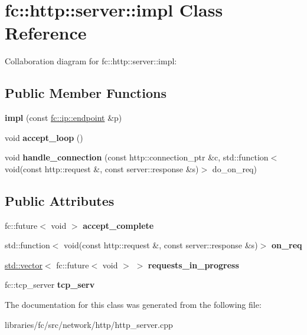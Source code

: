 \hypertarget{classfc_1_1http_1_1server_1_1impl}{}\section{fc\+:\+:http\+:\+:server\+:\+:impl Class Reference}
\label{classfc_1_1http_1_1server_1_1impl}


Collaboration diagram for fc\+:\+:http\+:\+:server\+:\+:impl\+:
\subsection*{Public Member Functions}
\begin{DoxyCompactItemize}
\item 
\mbox{\label{classfc_1_1http_1_1server_1_1impl_a37711a9ff92189c2bc7e59678b7c1843}} 
{\bfseries impl} (const \mbox{\hyperlink{classfc_1_1ip_1_1endpoint}{fc\+::ip\+::endpoint}} \&p)
\item 
\mbox{\label{classfc_1_1http_1_1server_1_1impl_aabc0d2b805bc3817da2f044adcb40d69}} 
void {\bfseries accept\+\_\+loop} ()
\item 
\mbox{\label{classfc_1_1http_1_1server_1_1impl_a7813e46dca69d44eb24a3ee0d6add574}} 
void {\bfseries handle\+\_\+connection} (const http\+::connection\+\_\+ptr \&c, std\+::function$<$ void(const http\+::request \&, const server\+::response \&s)$>$ do\+\_\+on\+\_\+req)
\end{DoxyCompactItemize}
\subsection*{Public Attributes}
\begin{DoxyCompactItemize}
\item 
\mbox{\label{classfc_1_1http_1_1server_1_1impl_a7b4b735ed75ec432b5ceaf0fc8eb5670}} 
fc\+::future$<$ void $>$ {\bfseries accept\+\_\+complete}
\item 
\mbox{\label{classfc_1_1http_1_1server_1_1impl_ab2bc0ecaf14d8ea531b0bd8c30ad5ebf}} 
std\+::function$<$ void(const http\+::request \&, const server\+::response \&s)$>$ {\bfseries on\+\_\+req}
\item 
\mbox{\label{classfc_1_1http_1_1server_1_1impl_a16522f5143dd2e01d81cc837acde2af3}} 
\mbox{\hyperlink{classstd_1_1vector}{std\+::vector}}$<$ fc\+::future$<$ void $>$ $>$ {\bfseries requests\+\_\+in\+\_\+progress}
\item 
\mbox{\label{classfc_1_1http_1_1server_1_1impl_ad32181bd6cc2d0942ca0295a6ea5d5a9}} 
fc\+::tcp\+\_\+server {\bfseries tcp\+\_\+serv}
\end{DoxyCompactItemize}


The documentation for this class was generated from the following file\+:\begin{DoxyCompactItemize}
\item 
libraries/fc/src/network/http/http\+\_\+server.\+cpp\end{DoxyCompactItemize}
